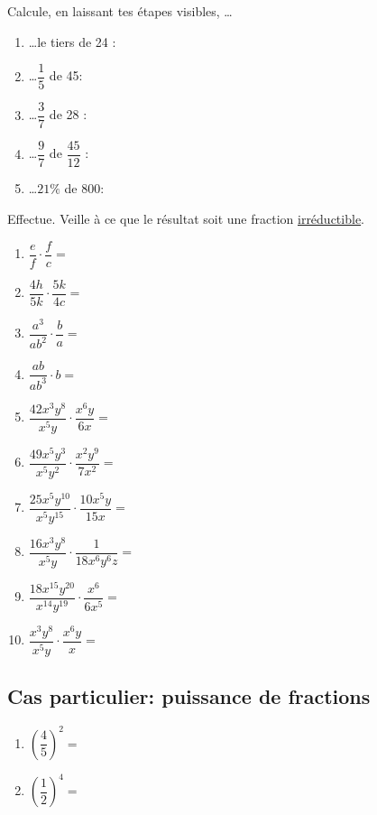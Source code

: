 \documentclass[../math2.tex]{subfiles}
\begin{document}
\begin{exercise}
  Calcule, en laissant tes étapes visibles, \dots
  \begin{enumerate}[itemsep=3cm]
    \item \dots le tiers de 24 :
    \item \dots $\dfrac{1}{5}$ de 45:
    \item \dots $\dfrac{3}{7}$ de 28 :
    \item \dots $\dfrac{9}{7}$ de $\dfrac{45}{12}$ :
    \item \dots $21\%$ de 800:
  \end{enumerate}
  \vspace*{3cm}
\end{exercise}

\begin{exercise}
  Effectue. Veille à ce que le résultat soit une fraction \underline{irréductible}.
  \begin{enumerate}[cols=2, itemsep=4cm]
    \item  $\dfrac{e}{f} \cdot \dfrac{f}{c}=$
    \item  $\dfrac{4h}{5k} \cdot \dfrac{5k}{4c}=$
    \item  $\dfrac{a^3}{ab^2} \cdot \dfrac{b}{a}=$
    \item  $\dfrac{ab}{ab^3} \cdot b=$
    \item  $\dfrac{42x^3y^8}{x^5y} \cdot \dfrac{x^6y}{6x}=$
    \item  $\dfrac{49x^5y^3}{x^5y^2} \cdot \dfrac{x^2y^9}{7x^2}=$
    \item  $\dfrac{25x^5y^{10}}{x^5y^{15}} \cdot \dfrac{10x^5y}{15x}=$
    \item  $\dfrac{16x^3y^8}{x^5y} \cdot \dfrac{1}{18 x^6 y^6 z}=$
    \item  $\dfrac{18 x^{15} y^{20}}{x^{14} y^{19}} \cdot \dfrac{x^6}{6 x^5}=$
    \item  $\dfrac{x^3y^8}{x^5y} \cdot \dfrac{x^6y}{x}=$
  \end{enumerate}
\end{exercise}

\newpage

\subsection*{Cas particulier: puissance de fractions}


\exemples 
\begin{enumerate}[cols=2, itemsep=3cm]
  \item $\left(\dfrac{4}{5}\right)^2=$
  \item $\left(\dfrac{1}{2}\right)^4=$
\end{enumerate}
\end{document}
